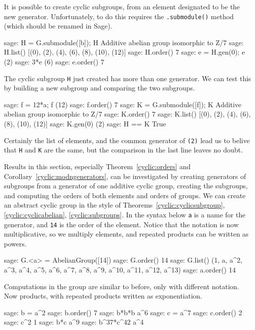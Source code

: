 %
It is possible to create cyclic subgroups, from an element designated to be the new generator.  Unfortunately, to do this requires the \verb?.submodule()? method (which should be renamed in Sage).
%
\begin{sageexample}
sage: H = G.submodule([b]); H
Additive abelian group isomorphic to Z/7
sage: H.list()
[(0), (2), (4), (6), (8), (10), (12)]
sage: H.order()
7
sage: e = H.gen(0); e
(2)
sage: 3*e
(6)
sage: e.order()
7
\end{sageexample}
%
The cyclic subgroup \verb?H? just created has more than one generator.  We can test this by building a new subgroup and comparing the two subgroups.
%
\begin{sageexample}
sage: f = 12*a; f
(12)
sage: f.order()
7
sage: K = G.submodule([f]); K
Additive abelian group isomorphic to Z/7
sage: K.order()
7
sage: K.list()
[(0), (2), (4), (6), (8), (10), (12)]
sage: K.gen(0)
(2)
sage: H == K
True
\end{sageexample}
%
Certainly the list of elements, and the common generator of \verb?(2)? lead us to belive that \verb?H? and \verb?K? are the same, but the comparison in the last line leaves no doubt.\par
%
Results in this section, especially Theorem~\ref{cyclic:orders} and Corollary~\ref{cyclic:modngenerators}, can be investigated by creating generators of subgroups from a generator of one additive cyclic group, creating the subgroups, and computing the orders of both elements and orders of groups.
%
%
We can create an abstract cyclic group in the style of Theorems~\ref{cyclic:cyclicsubgroup}, \ref{cyclic:cyclicabelian}, \ref{cyclic:subgroups}.  In the syntax below \verb?a? is a name for the generator, and \verb?14? is the order of the element.  Notice that the notation is now multiplicative, so we multiply elements, and repeated products can be written as powers.
%
\begin{sageexample}
sage: G.<a> = AbelianGroup([14])
sage: G.order()
14
sage: G.list()
(1, a, a^2, a^3, a^4, a^5, a^6, a^7, a^8, a^9, a^10, a^11, a^12, a^13)
sage: a.order()
14
\end{sageexample}
%
Computations in the group are similar to before, only with different notation.  Now products, with repeated products written as exponentiation.
%
\begin{sageexample}
sage: b = a^2
sage: b.order()
7
sage: b*b*b
a^6
sage: c = a^7
sage: c.order()
2
sage: c^2
1
sage: b*c
a^9
sage: b^37*c^42
a^4
\end{sageexample}

